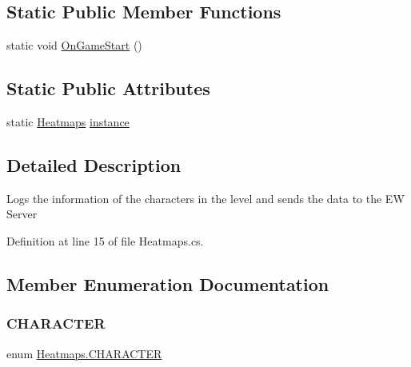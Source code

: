 \subsection*{Static Public Member Functions}
\begin{DoxyCompactItemize}
\item 
static void \mbox{\hyperlink{class_heatmaps_ac2383f96f0b2f7ba3d1d0b2f29330132}{On\+Game\+Start}} ()
\end{DoxyCompactItemize}
\subsection*{Static Public Attributes}
\begin{DoxyCompactItemize}
\item 
static \mbox{\hyperlink{class_heatmaps}{Heatmaps}} \mbox{\hyperlink{class_heatmaps_a01d67363532fbf42c8f728e7bd354029}{instance}}
\end{DoxyCompactItemize}


\subsection{Detailed Description}
Logs the information of the characters in the level and sends the data to the EW Server 



Definition at line 15 of file Heatmaps.\+cs.



\subsection{Member Enumeration Documentation}
\mbox{\label{class_heatmaps_a257e4582d0ae682783bce271d444d42b}} 
\subsubsection{\texorpdfstring{C\+H\+A\+R\+A\+C\+T\+ER}{CHARACTER}}
{\footnotesize\ttfamily enum \mbox{\hyperlink{class_heatmaps_a257e4582d0ae682783bce271d444d42b}{Heatmaps.\+C\+H\+A\+R\+A\+C\+T\+ER}}\hspace{0.3cm}{\ttfamily [strong]}}

